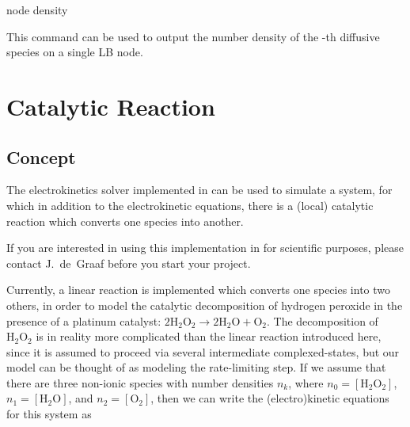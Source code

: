 \begin{essyntax}
  node   
  density
  \begin{features}
  \end{features}
\end{essyntax}
This command can be used to output the number density of the
-th diffusive species on a single LB node.

\section{Catalytic Reaction}

\subsection{Concept}

The electrokinetics solver implemented in \es{} can be used to
simulate a system, for which in addition to the electrokinetic
equations, there is a (local) catalytic reaction which converts one
species into another.

If you are interested in using this implementation in \es{} for
scientific purposes, please contact J.~de~Graaf before you start your
project.

Currently, a linear reaction is implemented which converts one species into two others, in
order to model the catalytic decomposition of hydrogen peroxide in the presence
of a platinum catalyst: $2 \mathrm{H}_{2}\mathrm{O}_{2} \rightarrow 
2 \mathrm{H}_{2}\mathrm{O} + \mathrm{O}_{2}$. The decomposition of 
$\mathrm{H}_{2}\mathrm{O}_{2}$ is in reality more complicated than the linear 
reaction introduced here, since it is assumed to proceed via several intermediate complexed-states, 
but our model can be thought of as modeling the rate-limiting step.
If we assume that there are three non-ionic species with number densities
$n_{k}$, where $n_{0} = [ \mathrm{H}_{2}\mathrm{O}_{2} ]$,
$n_{1} = [ \mathrm{H}_{2}\mathrm{O} ]$, and $n_{2} = [ \mathrm{O}_{2} ]$, 
then we can write the (electro)kinetic equations for this system as

